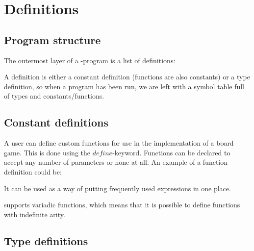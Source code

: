 \section{Definitions}
\label{sec:definitions}


\subsection{Program structure}

The outermost layer of a \productname{}-program is a list of definitions:

\begin{ebnf}
\end{ebnf}

A definition is either a constant definition (functions are also constants)
or a type definition, so when a program has been run, we are left with a
symbol table full of types and constants/functions.

\subsection{Constant definitions}

\begin{ebnf}
\end{ebnf}

\begin{ebnf}
\end{ebnf}


A user can define custom functions for use in the implementation of a board game.
This is done using the $define$-keyword. Functions can be declared to accept
any number of parameters or none at all. An example of a function definition could
be:


It can be used as a way of putting frequently used expressions in one place. 

\productname{} supports variadic functions, which means that it is possible to define
functions with indefinite arity.
\subsection{Type definitions}
\label{sec:typedefinitions}

\begin{ebnf}
\end{ebnf}

